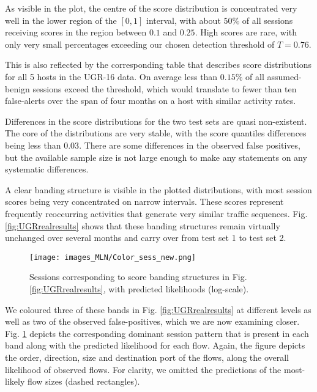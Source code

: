 As visible in the plot, the centre of the score distribution is concentrated very well in the lower region of the $[0,1]$ interval, with about $50\%$ of all sessions receiving scores in the region between $0.1$ and $0.25$. High scores are rare, with only very small percentages exceeding our chosen detection threshold of $T=0.76$.



This is also reflected by the corresponding table that describes score distributions for all 5 hosts in the UGR-16 data. On average less than $0.15\%$ of all assumed-benign sessions exceed the threshold, which would translate to fewer than ten false-alerts over the span of four months on a host with similar activity rates. 

Differences in the score distributions for the two test sets are quasi non-existent. The core of the distributions are very stable, with the score quantiles differences being less than $0.03$.
There are some differences in the observed false positives, but the available sample size is not large enough to make any statements on any systematic differences.

A clear banding structure is visible in the plotted distributions, with most session scores being very concentrated on narrow intervals. These scores represent frequently reoccurring activities that generate very similar traffic sequences. %
Fig. \ref{fig:UGRrealresults} shows that these banding structures remain virtually unchanged over several months and carry over from test set 1 to test set 2. 


\begin{figure}
\centering
\texttt{[image: images\_MLN/Color\_sess\_new.png]} 
\caption{Sessions corresponding to score banding structures in Fig. \ref{fig:UGRrealresults}, with predicted likelihoods (log-scale).}\label{fig:colsess}
\end{figure}

We coloured three of these bands in Fig. \ref{fig:UGRrealresults} at different levels as well as two of the observed false-positives, which we are now examining closer. Fig. \ref{fig:colsess} depicts the corresponding dominant session pattern that is present in each band along with the predicted likelihood for each flow. Again, the figure depicts the order, direction, size and destination port of the flows, along the overall likelihood of observed flows. For clarity, we omitted the predictions of the most-likely flow sizes (dashed rectangles).

